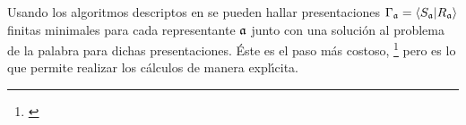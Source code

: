 Usando los algoritmos descriptos en \cite{VoightFuchsian} se pueden hallar
presentaciones $\Gamma_{\frak{a}}=\langle S_{\frak{a}}|R_{\frak{a}}\rangle$
finitas minimales para cada representante $\frak{a}$ junto con una soluci\'{o}n
al problema de la palabra para dichas presentaciones. \'{E}ste es el paso
m\'{a}s costoso,%
\footnote{
	\cite{GreenbergVoight}
}
pero es lo que permite realizar los c\'{a}lculos de manera expl\'{\i}cita.

%
